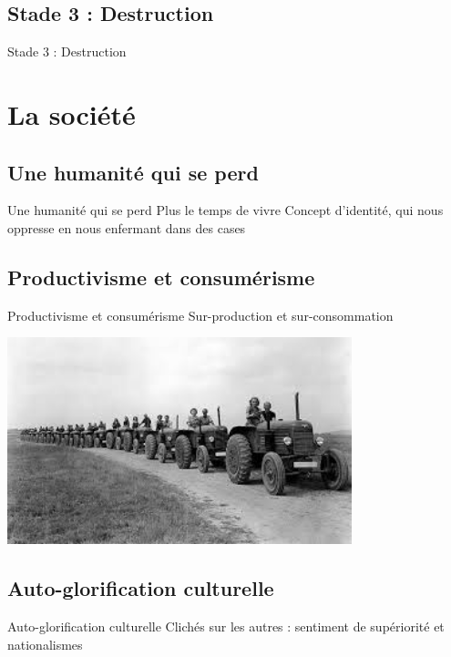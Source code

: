 \documentclass{beamer}
\begin{document}
\subsection{Stade 3 : Destruction}
\begin{frame}{Stade 3 : Destruction}

\end{frame}


\section{La société}

\subsection{Une humanité qui se perd}
\begin{frame}{Une humanité qui se perd}
  Plus le temps de vivre
  Concept d'identité, qui nous oppresse en nous enfermant dans des cases
\end{frame}

\subsection{Productivisme et consumérisme}
\begin{frame}{Productivisme et consumérisme}
  Sur-production et sur-consommation
  \begin{center}
    \includegraphics[width=10cm]{../Images/urss.png}
  \end{center}
\end{frame}

\subsection{Auto-glorification culturelle}
\begin{frame}{Auto-glorification culturelle}
  Clichés sur les autres : sentiment de supériorité et nationalismes
\end{frame}
\end{document}
